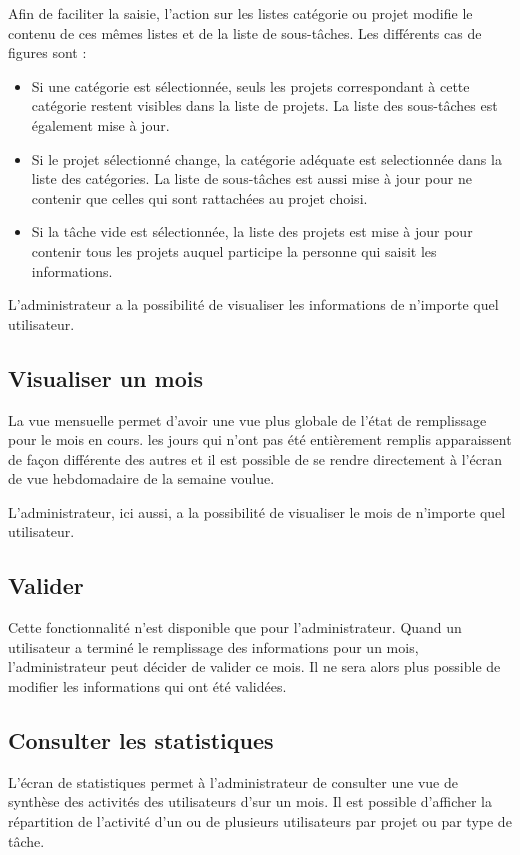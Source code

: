 Afin de faciliter la saisie, l'action sur les listes catégorie ou projet modifie le contenu de ces mêmes listes et de la liste de sous-tâches. Les différents cas de figures sont :

\begin{itemize}
\item Si une catégorie est sélectionnée, seuls les projets correspondant à cette catégorie restent visibles dans la liste de projets. La liste des sous-tâches est également mise à jour.
\item Si le projet sélectionné change, la catégorie adéquate est selectionnée dans la liste des catégories. La liste de sous-tâches est aussi mise à jour pour ne contenir que celles qui sont rattachées au projet choisi.
\item Si la tâche vide est sélectionnée, la liste des projets est mise à jour pour contenir tous les projets auquel participe la personne qui saisit les informations.
\end{itemize}

L'administrateur a la possibilité de visualiser les informations de n'importe quel utilisateur.

\subsection{Visualiser un mois}

La vue mensuelle permet d'avoir une vue plus globale de l'état de remplissage pour le mois en cours. les jours qui n'ont pas été entièrement remplis apparaissent de façon différente des autres et il est possible de se rendre directement à l'écran de vue hebdomadaire de la semaine voulue.

L'administrateur, ici aussi, a la possibilité de visualiser le mois de n'importe quel utilisateur.

\subsection{Valider}

Cette fonctionnalité n'est disponible que pour l'administrateur. Quand un utilisateur a terminé le remplissage des informations pour un mois, l'administrateur peut décider de valider ce mois. Il ne sera alors plus possible de modifier les informations qui ont été validées.

\subsection{Consulter les statistiques}

L'écran de statistiques permet à l'administrateur de consulter une vue de synthèse des activités des utilisateurs d'\obm sur un mois. Il est possible d'afficher la répartition de l'activité d'un ou de plusieurs utilisateurs par projet ou par type de tâche.